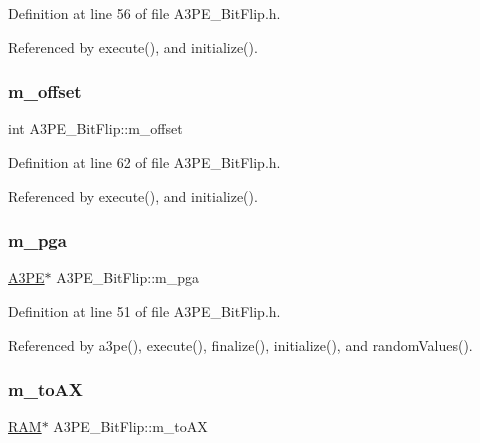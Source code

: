 Definition at line 56 of file A3\+P\+E\+\_\+\+Bit\+Flip.\+h.



Referenced by execute(), and initialize().

\mbox{\label{classA3PE__BitFlip_ac0797dd65b1aeab96647d795e2f1a447}} 
\subsubsection{\texorpdfstring{m\+\_\+offset}{m\_offset}}
{\footnotesize\ttfamily int A3\+P\+E\+\_\+\+Bit\+Flip\+::m\+\_\+offset\hspace{0.3cm}{\ttfamily [private]}}



Definition at line 62 of file A3\+P\+E\+\_\+\+Bit\+Flip.\+h.



Referenced by execute(), and initialize().

\mbox{\label{classA3PE__BitFlip_ad20d7abccf27fa87b931cb77cd6b5e41}} 
\subsubsection{\texorpdfstring{m\+\_\+pga}{m\_pga}}
{\footnotesize\ttfamily \hyperlink{classA3PE}{A3\+PE}$\ast$ A3\+P\+E\+\_\+\+Bit\+Flip\+::m\+\_\+pga\hspace{0.3cm}{\ttfamily [private]}}



Definition at line 51 of file A3\+P\+E\+\_\+\+Bit\+Flip.\+h.



Referenced by a3pe(), execute(), finalize(), initialize(), and random\+Values().

\mbox{\label{classA3PE__BitFlip_a0ac416167c83d423cda4e09a892b5255}} 
\subsubsection{\texorpdfstring{m\+\_\+to\+AX}{m\_toAX}}
{\footnotesize\ttfamily \hyperlink{classRAM}{R\+AM}$\ast$ A3\+P\+E\+\_\+\+Bit\+Flip\+::m\+\_\+to\+AX\hspace{0.3cm}{\ttfamily [private]}}



